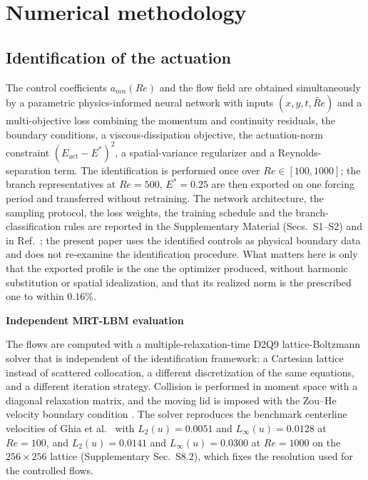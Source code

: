 \documentclass[11pt,a4paper]{article}
\newcommand{\Eact}{E_{\mathrm{act}}}
\newenvironment{chgdel}{\par\color{red}}{\par\color{black}}
\begin{document}
\section{Numerical methodology}
\label{sec:methods}

\subsection{Identification of the actuation}

\begin{chgdel}
The control coefficients $a_{mn}(Re)$ and the flow field are obtained simultaneously
by a parametric physics-informed neural network with inputs $(x,y,t,\widetilde{Re})$
and a multi-objective loss combining the momentum and continuity residuals, the
boundary conditions, a viscous-dissipation objective, the actuation-norm
constraint $(\Eact-E^\ast)^2$, a spatial-variance regularizer and a
Reynolds-separation term. The identification is performed once over
$Re\in[100,1000]$; the branch representatives at $Re=500$, $E^\ast=0.25$ are then
exported on one forcing period and transferred without retraining. The network
architecture, the sampling protocol, the loss weights, the training schedule and
the branch-classification rules are reported in the Supplementary Material
(Secs.~S1--S2) and in Ref.~; the present paper uses the
identified controls as physical boundary data and does not re-examine the
identification procedure. What matters here is only that the exported profile is
the one the optimizer produced, without harmonic substitution or spatial
idealization, and that its realized norm is the prescribed one to within
$0.16\%$.

\textbf{Independent MRT-LBM evaluation}

The flows are computed with a multiple-relaxation-time D2Q9 lattice-Boltzmann
solver  that is independent of the
identification framework: a Cartesian lattice instead of scattered collocation, a
different discretization of the same equations, and a different iteration
strategy. Collision is performed in moment space with a diagonal relaxation
matrix, and the moving lid is imposed with the Zou--He velocity boundary
condition . The solver reproduces the benchmark
centerline velocities of Ghia et al.~ with
$L_2(u)=0.0051$ and $L_\infty(u)=0.0128$ at $Re=100$, and
$L_2(u)=0.0141$ and $L_\infty(u)=0.0300$ at $Re=1000$ on the
$256\times256$ lattice (Supplementary Sec.~S8.2), which fixes the resolution used
for the controlled flows.


\end{chgdel}
\end{document}
